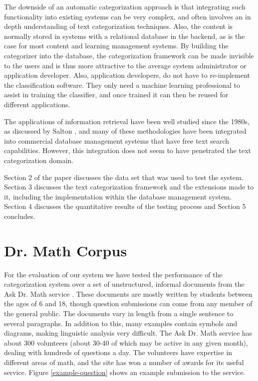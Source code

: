 \documentclass{ios}
\begin{document}
The downside of an automatic categorization approach is that integrating such 
functionality into existing systems can be very complex, and often involves an in 
depth understanding of text categorization techniques.  Also, the content is normally 
stored in systems with a relational database in the backend, as is the case for most 
content and learning management systems. By building the categorizer into the 
database, the categorization framework \cite{williams:02} can be made invisible to the 
users and is thus more attractive to the average system administrator or application 
developer. Also, application developers, do not have to re-implement the 
classification software. They only need a machine learning professional to assist in 
training the classifier, and once trained it can then be reused for different applications. 

The applications of information retrieval have been well studied since the 1980s, as 
discussed by Salton \cite{salton:89,salton:91}, and many of these methodologies have been 
integrated into commercial database management systems that have free text search 
capabilities. However, this integration does not seem to have penetrated the text 
categorization domain.

Section 2 of the paper discusses the data set that was used to test
the system. Section 3 discusses the text categorization framework and
the extensions made to it, including the implementation within the
database management system. Section 4 discusses the quantitative
results of the testing process and Section 5 concludes.

\section{Dr. Math Corpus}
\label{corpus}

For the evaluation of our system we have tested the performance of the
categorization system over a set of unstructured, informal documents
from the Ask Dr. Math service \cite{drmath}. These documents are mostly
written by students between the ages of 6 and 18, though question
submissions can come from any member of the general public.  The documents vary
in length from a single sentence to several paragraphs. In addition to
this, many examples contain symbols and diagrams, making linguistic
analysis very difficult. The Ask Dr. Math service has about 300
volunteers (about 30-40 of which may be active in any given month),
dealing with hundreds of questions a day. The volunteers have
expertise in different areas of math, and the site has won a number of
awards for its useful service.  Figure \ref{example-question} shows an
example submission to the service.
\end{document}
